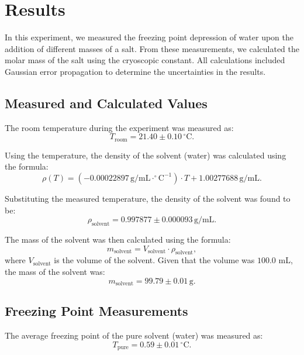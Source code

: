 \documentclass[a4paper,12pt]{article}
\begin{document}
\section{Results}
In this experiment, we measured the freezing point depression of water upon the addition of different masses of a salt. From these measurements, we calculated the molar mass of the salt using the cryoscopic constant. All calculations included Gaussian error propagation to determine the uncertainties in the results.

\subsection{Measured and Calculated Values}
The room temperature during the experiment was measured as:
\begin{equation}
T_{\text{room}} = 21.40 \pm 0.10 \, ^\circ\text{C}.
\end{equation}

Using the temperature, the density of the solvent (water) was calculated using the formula:
\begin{equation}
\rho(T) = (-0.00022897 \, \text{g/mL} \cdot ^\circ\text{C}^{-1}) \cdot T + 1.00277688 \, \text{g/mL}.
\end{equation}

Substituting the measured temperature, the density of the solvent was found to be:
\begin{equation}
\rho_{\text{solvent}} = 0.997877 \pm 0.000093 \, \text{g/mL}.
\end{equation}

The mass of the solvent was then calculated using the formula:
\begin{equation}
m_{\text{solvent}} = V_{\text{solvent}} \cdot \rho_{\text{solvent}},
\end{equation}
where $V_{\text{solvent}}$ is the volume of the solvent. Given that the volume was $100.0$ mL, the mass of the solvent was:
\begin{equation}
m_{\text{solvent}} = 99.79 \pm 0.01 \, \text{g}.
\end{equation}

\subsection{Freezing Point Measurements}
The average freezing point of the pure solvent (water) was measured as:
\begin{equation}
T_{\text{pure}} = 0.59 \pm 0.01 \, ^\circ\text{C}.
\end{equation}
\end{document}
